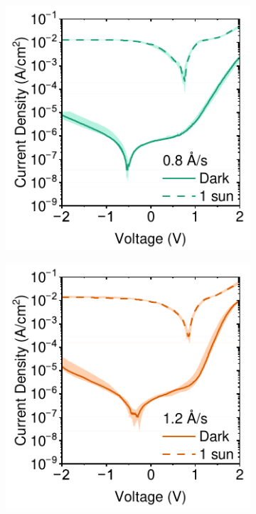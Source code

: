\begin{figure}[htbp]
    \centering
    \begin{subfigure}[t]{0.45\textwidth}
        \centering
        \includegraphics[width=\textwidth]{chapters/material_properties/images/08As-JV.pdf} 
        \caption{}
        \label{fig:ch2:0.8A/s-jv}
    \end{subfigure}
    \hfill
    \begin{subfigure}[t]{0.45\textwidth}
        \centering
        \includegraphics[width=\textwidth]{chapters/material_properties/images/12AS-JV.pdf} %
        \caption{}
        \label{fig:ch2:1.2A/s-vj}
    \end{subfigure}


\end{figure}

